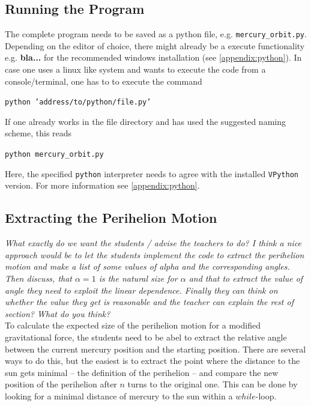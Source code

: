 \documentclass[12pt]{iopart}
\begin{document}
\subsection{Running the Program}
The complete program needs to be saved as a python file, e.g. \texttt{mercury\_orbit.py}.
Depending on the editor of choice, there might already be a execute functionality e.g. \textbf{bla...} for the recommended windows installation (see \ref{appendix:python}).
%
%
In case one uses a linux like system and wants to execute the code from a console/terminal, one has to to execute the command
\begin{center}
	\texttt{python 'address/to/python/file.py'}
\end{center}
If one already works in the file directory and has used the suggested naming scheme, this reads 
\begin{center}
	\texttt{python mercury\_orbit.py}
\end{center}
Here, the specified \texttt{python} interpreter needs to agree with the installed \texttt{VPython} version.
For more information see \ref{appendix:python}.

\subsection{Extracting the Perihelion Motion}

\textit{What exactly do we want the students / advise the teachers to do? I think a nice approach would be to let the students implement the code to extract the perihelion motion and make a list of some values of alpha and the corresponding angles. Then discuss, that $\alpha=1$ is the natural size for $\alpha$ and that to extract the value of angle they need to exploit the linear dependence. Finally they can think on whether the value they get is reasonable and the teacher can explain the rest of section? What do you think?}\\

To calculate the expected size of the perihelion motion for a modified gravitational force, the students need to be abel to extract the relative angle between the current mercury position and the starting position.
There are several ways to do this, but the easiest is to extract the point where the distance to the sun gets minimal -- the definition of the perihelion -- and compare the new position of the perihelion after $n$ turns to the original one.
This can be done by looking for a minimal distance of mercury to the sun within a $while$-loop.
\end{document}
